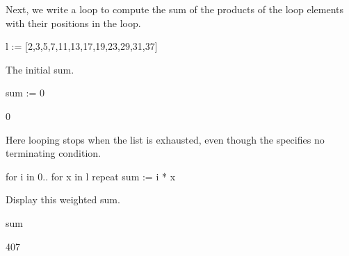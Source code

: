 {\begin{xtc}
\begin{xtccomment}
Next, we write a loop to compute the sum of the products of the loop elements with
their positions in the loop.
\end{xtccomment}
\begin{spadsrc}
l := [2,3,5,7,11,13,17,19,23,29,31,37] 
\end{spadsrc}
\begin{TeXOutput}
\begin{fricasmath}{6}
%
\end{fricasmath}
\end{TeXOutput}
\end{xtc}
\begin{xtc}
\begin{xtccomment}
The initial sum.
\end{xtccomment}
\begin{spadsrc}
sum := 0 
\end{spadsrc}
\begin{TeXOutput}
\begin{fricasmath}{7}
0%
\end{fricasmath}
\end{TeXOutput}
\end{xtc}
\begin{xtc}
\begin{xtccomment}
Here looping stops when the list  is exhausted, even though
the  specifies no terminating condition.
\end{xtccomment}
\begin{spadsrc}
for i in 0.. for x in l repeat sum := i * x 
\end{spadsrc}
\end{xtc}
\begin{xtc}
\begin{xtccomment}
Display this weighted sum.
\end{xtccomment}
\begin{spadsrc}
sum 
\end{spadsrc}
\begin{TeXOutput}
\begin{fricasmath}{9}
407%
\end{fricasmath}
\end{TeXOutput}
\end{xtc}

}

